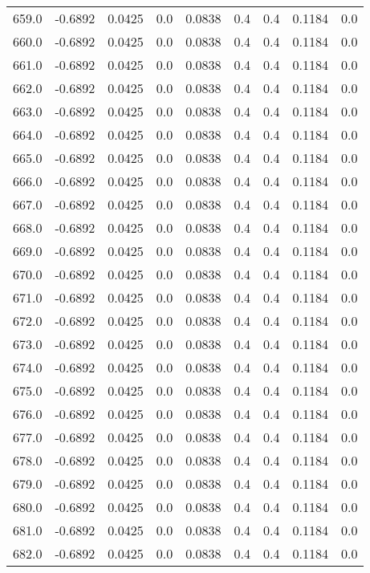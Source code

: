\begin{longtable}{lrrrrrrrr}
659.0 & -0.6892 & 0.0425 & 0.0 & 0.0838 & 0.4 & 0.4 & 0.1184 & 0.0 \\
660.0 & -0.6892 & 0.0425 & 0.0 & 0.0838 & 0.4 & 0.4 & 0.1184 & 0.0 \\
661.0 & -0.6892 & 0.0425 & 0.0 & 0.0838 & 0.4 & 0.4 & 0.1184 & 0.0 \\
662.0 & -0.6892 & 0.0425 & 0.0 & 0.0838 & 0.4 & 0.4 & 0.1184 & 0.0 \\
663.0 & -0.6892 & 0.0425 & 0.0 & 0.0838 & 0.4 & 0.4 & 0.1184 & 0.0 \\
664.0 & -0.6892 & 0.0425 & 0.0 & 0.0838 & 0.4 & 0.4 & 0.1184 & 0.0 \\
665.0 & -0.6892 & 0.0425 & 0.0 & 0.0838 & 0.4 & 0.4 & 0.1184 & 0.0 \\
666.0 & -0.6892 & 0.0425 & 0.0 & 0.0838 & 0.4 & 0.4 & 0.1184 & 0.0 \\
667.0 & -0.6892 & 0.0425 & 0.0 & 0.0838 & 0.4 & 0.4 & 0.1184 & 0.0 \\
668.0 & -0.6892 & 0.0425 & 0.0 & 0.0838 & 0.4 & 0.4 & 0.1184 & 0.0 \\
669.0 & -0.6892 & 0.0425 & 0.0 & 0.0838 & 0.4 & 0.4 & 0.1184 & 0.0 \\
670.0 & -0.6892 & 0.0425 & 0.0 & 0.0838 & 0.4 & 0.4 & 0.1184 & 0.0 \\
671.0 & -0.6892 & 0.0425 & 0.0 & 0.0838 & 0.4 & 0.4 & 0.1184 & 0.0 \\
672.0 & -0.6892 & 0.0425 & 0.0 & 0.0838 & 0.4 & 0.4 & 0.1184 & 0.0 \\
673.0 & -0.6892 & 0.0425 & 0.0 & 0.0838 & 0.4 & 0.4 & 0.1184 & 0.0 \\
674.0 & -0.6892 & 0.0425 & 0.0 & 0.0838 & 0.4 & 0.4 & 0.1184 & 0.0 \\
675.0 & -0.6892 & 0.0425 & 0.0 & 0.0838 & 0.4 & 0.4 & 0.1184 & 0.0 \\
676.0 & -0.6892 & 0.0425 & 0.0 & 0.0838 & 0.4 & 0.4 & 0.1184 & 0.0 \\
677.0 & -0.6892 & 0.0425 & 0.0 & 0.0838 & 0.4 & 0.4 & 0.1184 & 0.0 \\
678.0 & -0.6892 & 0.0425 & 0.0 & 0.0838 & 0.4 & 0.4 & 0.1184 & 0.0 \\
679.0 & -0.6892 & 0.0425 & 0.0 & 0.0838 & 0.4 & 0.4 & 0.1184 & 0.0 \\
680.0 & -0.6892 & 0.0425 & 0.0 & 0.0838 & 0.4 & 0.4 & 0.1184 & 0.0 \\
681.0 & -0.6892 & 0.0425 & 0.0 & 0.0838 & 0.4 & 0.4 & 0.1184 & 0.0 \\
682.0 & -0.6892 & 0.0425 & 0.0 & 0.0838 & 0.4 & 0.4 & 0.1184 & 0.0 \\

\end{longtable}
